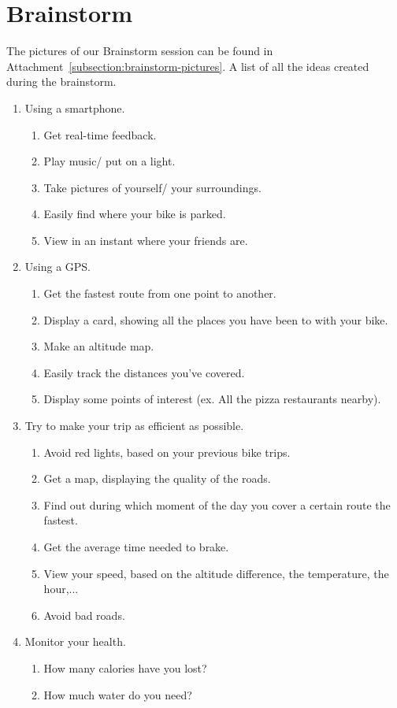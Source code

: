 \section{Brainstorm}
The pictures of our Brainstorm session can be found in Attachment~\ref{subsection:brainstorm-pictures}.
A list of all the ideas created during the brainstorm.
\begin{enumerate}
 \item Using a smartphone.
 \begin{enumerate}
 \item Get real-time feedback.
 \item Play music/ put on a light.
 \item Take pictures of yourself/ your surroundings.
 \item Easily find where your bike is parked.
 \item View in an instant where your friends are.
 \end{enumerate}
 \item Using a GPS.
  \begin{enumerate}
  \item Get the fastest route from one point to another.
  \item Display a card, showing all the places you have been to with your bike. 
  \item Make an altitude map.
  \item Easily track the distances you've covered.
  \item Display some points of interest (ex. All the pizza restaurants nearby).
  \end{enumerate}
  \item Try to make your trip as efficient as possible.
  \begin{enumerate}
  \item Avoid red lights, based on your previous bike trips.
  \item Get a map, displaying the quality of the roads.
  \item Find out during which moment of the day you cover a certain route the fastest.
  \item Get the average time needed to brake.
  \item View your speed, based on the altitude difference, the temperature, the hour,...
  \item Avoid bad roads.
  \end{enumerate}
  \item Monitor your health.
  \begin{enumerate}
   \item How many calories have you lost?
    \item How much water do you need?
  \end{enumerate}
\end{enumerate}


